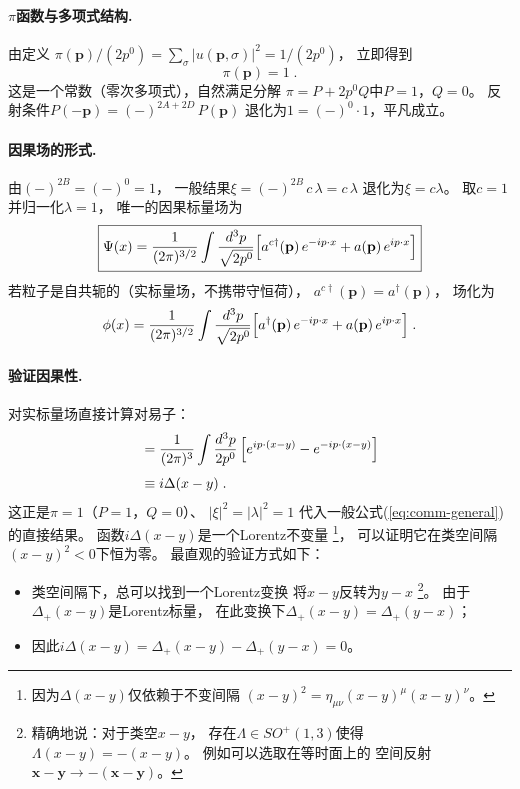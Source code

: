 \paragraph{$\pi$函数与多项式结构.}
由定义
$\pi(\mathbf{p})/(2p^{0})
=\sum_{\sigma}|u(\mathbf{p},\sigma)|^{2}
=1/(2p^{0})$，
立即得到
\begin{equation}\label{eq:pi-scalar}
  \pi(\mathbf{p})=1\;.
\end{equation}
这是一个常数（零次多项式），自然满足分解
$\pi = P + 2p^{0}Q$中$P=1$，$Q=0$。
反射条件$P(-\mathbf{p})=(-)^{2A+2D}\,P(\mathbf{p})$
退化为$1=(-)^{0}\cdot 1$，平凡成立。
\paragraph{因果场的形式.}
由$(-)^{2B}=(-)^{0}=1$，
一般结果$\xi = (-)^{2B}\,c\,\lambda = c\,\lambda$
退化为$\xi=c\lambda$。
取$c=1$并归一化$\lambda=1$，
唯一的因果标量场为
\begin{equation}\label{eq:scalar-field}
  \boxed{
  \Psi(x)
  = \frac{1}{(2\pi)^{3/2}}\int\frac{d^{3}p}{\sqrt{2p^{0}}}
    \Bigl[a^{c\dagger}(\mathbf{p})\,e^{-ip\cdot x}
    + a(\mathbf{p})\,e^{ip\cdot x}\Bigr]
  }
\end{equation}
若粒子是自共轭的（实标量场，不携带守恒荷），
$a^{c\dagger}(\mathbf{p})=a^{\dagger}(\mathbf{p})$，
场化为
\begin{equation}\label{eq:real-scalar}
  \phi(x)
  = \frac{1}{(2\pi)^{3/2}}\int\frac{d^{3}p}{\sqrt{2p^{0}}}
    \Bigl[a^{\dagger}(\mathbf{p})\,e^{-ip\cdot x}
    + a(\mathbf{p})\,e^{ip\cdot x}\Bigr]\;.
\end{equation}

\paragraph{验证因果性.}
对实标量场直接计算对易子：
\begin{align}
  [\phi(x),\,\phi(y)]
  &= \frac{1}{(2\pi)^{3}}\int\frac{d^{3}p}{2p^{0}}\,
    \Bigl[e^{ip\cdot(x-y)} - e^{-ip\cdot(x-y)}\Bigr]
    \notag\\[3pt]
  &\equiv i\Delta(x-y)\;.
  \label{eq:scalar-commutator}
\end{align}
这正是$\pi=1$（$P=1$，$Q=0$）、
$|\xi|^{2}=|\lambda|^{2}=1$
代入一般公式(\ref{eq:comm-general})的直接结果。
函数$i\Delta(x-y)$是一个Lorentz不变量%
\footnote{
  因为$\Delta(x-y)$仅依赖于不变间隔
  $(x-y)^{2}=\eta_{\mu\nu}(x-y)^{\mu}(x-y)^{\nu}$。
}，
可以证明它在类空间隔$(x-y)^{2}<0$下恒为零。
最直观的验证方式如下：
\begin{itemize}
  \item 类空间隔下，总可以找到一个Lorentz变换
        将$x-y$反转为$y-x$%
        \footnote{
          精确地说：对于类空$x-y$，
          存在$\Lambda\in SO^{+}(1,3)$使得
          $\Lambda(x-y)=-(x-y)$。
          例如可以选取在等时面上的
          空间反射$\mathbf{x}-\mathbf{y}\to
          -(\mathbf{x}-\mathbf{y})$。
        }。
        由于$\Delta_{+}(x-y)$是Lorentz标量，
        在此变换下$\Delta_{+}(x-y)=\Delta_{+}(y-x)$；
  \item 因此$i\Delta(x-y)
        =\Delta_{+}(x-y)-\Delta_{+}(y-x)=0$。
\end{itemize}




